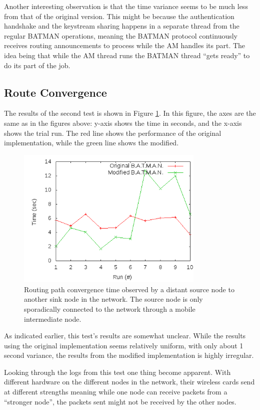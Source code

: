 Another interesting observation is that the time variance seems to be much less
from that of the original version. This might be because the authentication
handshake and the keystream sharing happens in a separate thread from the
regular BATMAN operations, meaning the BATMAN protocol continuously receives
routing announcements to process while the \ac{AM} handles its part. The idea
being that while the \ac{AM} thread runs the BATMAN thread ``gets ready'' to do
its part of the job.

\subsection{Route Convergence}
The results of the second test is shown in Figure \ref{fig:results_test_2}. In
this figure, the axes are the same as in the figures above: y-axis shows the
time in seconds, and the x-axis shows the trial run. The red line shows the
performance of the original implementation, while the green line shows the
modified.

\begin{figure}[h]
	\centering
	\includegraphics[width=0.8\textwidth]{images/test_2.png}
	\caption{Routing path convergence time observed by a distant source node to another sink node in the network. The source node is only sporadically connected to the network through a mobile intermediate node.}
	\label{fig:results_test_2}
\end{figure}

As indicated earlier, this test's results are somewhat unclear. While the
results using the original implementation seems relatively uniform, with only
about 1 second variance, the results from the modified implementation is highly
irregular.

Looking through the logs from this test one thing become apparent. With
different hardware on the different nodes in the network, their wireless cards
send at different strengths meaning while one node can receive packets from a
``stronger node'', the packets sent might not be received by the other nodes.

